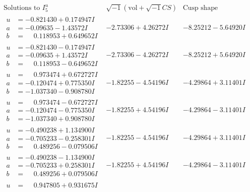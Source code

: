 \documentclass[1p]{elsarticle_modified}
\theoremstyle{definition}
\newcommand{\I}{\sqrt{-1}}
\begin{document}
$$\begin{array}{c|c|c}  
\text{Solutions to }I^u_{5}& \I (\text{vol} + \sqrt{-1}CS) & \text{Cusp shape}\\
 \hline 
\begin{aligned}
u &= -0.821430 + 0.174947 I \\
a &= -0.09635 - 1.43572 I \\
b &= \phantom{-}0.118953 + 0.649652 I\end{aligned}
 & -2.73306 + 4.26272 I & -8.25212 - 5.64920 I \\ \hline\begin{aligned}
u &= -0.821430 - 0.174947 I \\
a &= -0.09635 + 1.43572 I \\
b &= \phantom{-}0.118953 - 0.649652 I\end{aligned}
 & -2.73306 - 4.26272 I & -8.25212 + 5.64920 I \\ \hline\begin{aligned}
u &= \phantom{-}0.973474 + 0.672727 I \\
a &= -0.120474 + 0.775350 I \\
b &= -1.037340 - 0.908780 I\end{aligned}
 & -1.82255 - 4.54196 I & -4.29864 + 3.11401 I \\ \hline\begin{aligned}
u &= \phantom{-}0.973474 - 0.672727 I \\
a &= -0.120474 - 0.775350 I \\
b &= -1.037340 + 0.908780 I\end{aligned}
 & -1.82255 + 4.54196 I & -4.29864 - 3.11401 I \\ \hline\begin{aligned}
u &= -0.490238 + 1.134900 I \\
a &= -0.705233 - 0.258301 I \\
b &= \phantom{-}0.489256 - 0.079506 I\end{aligned}
 & -1.82255 - 4.54196 I & -4.29864 + 3.11401 I \\ \hline\begin{aligned}
u &= -0.490238 - 1.134900 I \\
a &= -0.705233 + 0.258301 I \\
b &= \phantom{-}0.489256 + 0.079506 I\end{aligned}
 & -1.82255 + 4.54196 I & -4.29864 - 3.11401 I \\ \hline\begin{aligned}
u &= \phantom{-}0.947805 + 0.931675 I \\

\end{aligned}
\end{array}$$
\end{document}
